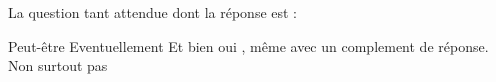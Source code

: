 La question tant attendue dont la réponse est :
\begin{choices}
    \choice Peut-être
    \choice Eventuellement
    \correctchoice Et bien oui
           \ifissolution, même avec un complement de réponse. \fi
    \choice Non surtout pas
\end{choices}